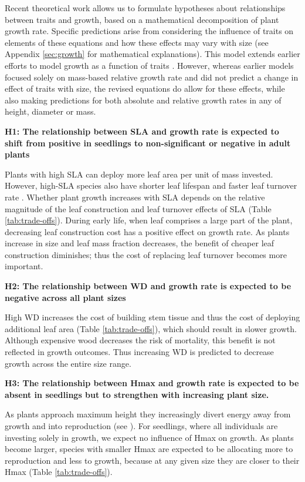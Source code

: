 \documentclass[a4paper,11pt]{article}
\begin{document}
Recent theoretical work \citep{Falster:2011ii} allows us to formulate hypotheses about relationships between traits and growth, based on a mathematical decomposition of plant growth rate. Specific predictions arise from considering the influence of traits on elements of these equations and how these effects may vary with size (see Appendix \ref{sec:growth} for mathematical explanations). This model extends earlier efforts to model growth as a function of traits \citep{Lambers:1992bj,cornelissen_seedling_1996,Wright:2000kw,Enquist:2007ek}. However, whereas earlier models focused solely on mass-based relative growth rate and did not predict a change in effect of traits with size, the revised equations do allow for these effects, while also making predictions for both absolute and relative growth rates in any of height, diameter or mass.

\textbf{H1: The relationship between SLA and growth rate is expected to shift from positive in seedlings to non-significant or negative in adult plants}

Plants with high SLA can deploy more leaf area per unit of mass invested. However, high-SLA species also have shorter leaf lifespan and faster leaf turnover rate \citep{Wright:2004jb}. Whether plant growth increases with SLA depends on the relative magnitude of the leaf construction and leaf turnover effects of SLA (Table \ref{tab:trade-offs}). During early life, when leaf comprises a large part of the plant, decreasing leaf construction cost has a positive effect on growth rate. As plants increase in size and leaf mass fraction decreases, the benefit of cheaper leaf construction diminishes; thus the cost of replacing leaf turnover becomes more important.

\textbf{H2: The relationship between WD and growth rate is expected to be negative across all plant sizes}

High WD increases the cost of building stem tissue and thus the cost of deploying additional leaf area (Table \ref{tab:trade-offs}), which should result in slower growth. Although expensive wood decreases the risk of mortality, this benefit is not reflected in growth outcomes. Thus increasing WD is predicted to decrease growth across the entire size range.

\textbf{H3: The relationship between Hmax and growth rate is expected to be absent in seedlings but to strengthen with increasing plant size.}

As plants approach maximum height they increasingly divert energy away from growth and into reproduction (see \citealt{Thomas:1996do,Thomas-2011, Wenk:2014jz}). For seedlings, where all individuals are investing solely in growth, we expect no influence of Hmax on growth. As plants become larger, species with smaller Hmax are expected to be allocating more to reproduction and less to growth, because at any given size they are closer to their Hmax (Table \ref{tab:trade-offs}).
\end{document}
